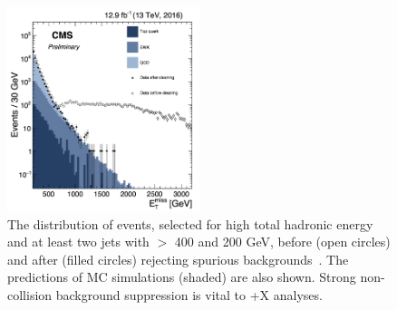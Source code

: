 \begin{figure}[!htpb]
\includegraphics[width=0.5\textwidth]{figures/FakeMETTemp.png}
\caption{The \MET distribution of events, selected for high total hadronic energy and at least two jets with \pt{} $>$ 400 and 200 GeV, before (open circles) and after (filled circles) rejecting spurious \MET backgrounds~\cite{CMS-PAS-JME-16-004}. The predictions of MC simulations (shaded) are also shown.
Strong non-collision background suppression is vital to \MET+X analyses.}
\label{fig:fakeMET}
\end{figure}

%

